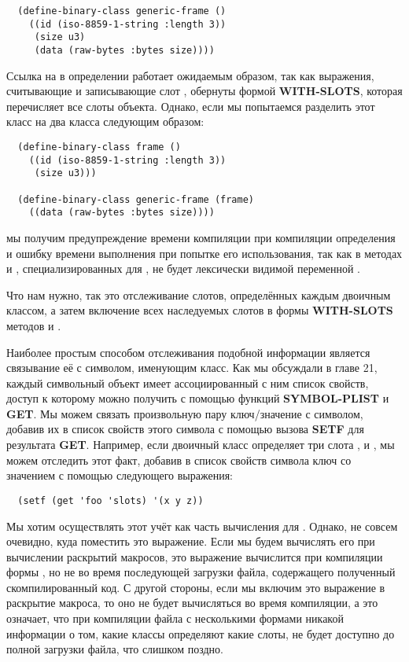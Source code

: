 \begin{lstlisting}
  (define-binary-class generic-frame ()
    ((id (iso-8859-1-string :length 3))
     (size u3)
     (data (raw-bytes :bytes size))))
\end{lstlisting}

Ссылка на  в определении  работает ожидаемым образом, так как
выражения, считывающие и записывающие слот , обернуты формой
\textbf{WITH-SLOTS}, которая перечисляет все слоты объекта. Однако, если мы попытаемся
разделить этот класс на два класса следующим образом:

\begin{lstlisting}
  (define-binary-class frame ()
    ((id (iso-8859-1-string :length 3))
     (size u3)))

  (define-binary-class generic-frame (frame)
    ((data (raw-bytes :bytes size))))
\end{lstlisting}

мы получим предупреждение времени компиляции при компиляции определения
 и ошибку времени выполнения при попытке его использования, так как в
методах  и , специализированных для
, не будет лексически видимой переменной .

Что нам нужно, так это отслеживание слотов, определённых каждым двоичным классом, а затем
включение всех наследуемых слотов в формы \textbf{WITH-SLOTS} методов  и
.

Наиболее простым способом отслеживания подобной информации является связывание её с
символом, именующим класс. Как мы обсуждали в главе 21, каждый символьный объект имеет
ассоциированный с ним список свойств, доступ к которому можно получить с помощью функций
\textbf{SYMBOL-PLIST} и \textbf{GET}. Мы можем связать произвольную пару ключ/значение с
символом, добавив их в список свойств этого символа с помощью вызова \textbf{SETF} для
результата \textbf{GET}. Например, если двоичный класс  определяет три слота
,  и , мы можем отследить этот факт, добавив в список свойств
символа  ключ  со значением  с помощью следующего
выражения:

\begin{lstlisting}
  (setf (get 'foo 'slots) '(x y z))
\end{lstlisting}

Мы хотим осуществлять этот учёт как часть вычисления  для
. Однако, не совсем очевидно, куда поместить это выражение. Если мы будем
вычислять его при вычислении раскрытий макросов, это выражение вычислится при компиляции
формы , но не во время последующей загрузки файла, содержащего
полученный скомпилированный код. С другой стороны, если мы включим это выражение в
раскрытие макроса, то оно не будет вычисляться во время компиляции, а это означает, что
при компиляции файла с несколькими формами  никакой информации о
том, какие классы определяют какие слоты, не будет доступно до полной загрузки файла, что
слишком поздно.

